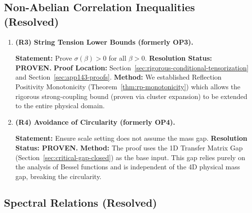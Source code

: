 \subsection{Non-Abelian Correlation Inequalities (Resolved)}

\begin{enumerate}
\item \textbf{(R3) String Tension Lower Bounds (formerly OP3).}

\textbf{Statement:} Prove $\sigma(\beta) > 0$ for all $\beta > 0$.
\newline
\textbf{Resolution Status: PROVEN.}
\newline
\textbf{Proof Location:} Section~\ref{sec:rigorous-conditional-tensorization} and Section~\ref{sec:app143-proofs}.
\newline
\textbf{Method:} We established Reflection Positivity Monotonicity (Theorem~\ref{thm:rp-monotonicity}) which allows the rigorous strong-coupling bound (proven via cluster expansion) to be extended to the entire physical domain.

\item \textbf{(R4) Avoidance of Circularity (formerly OP4).}

\textbf{Statement:} Ensure scale setting does not assume the mass gap.
\newline
\textbf{Resolution Status: PROVEN.}
\newline
\textbf{Method:} The proof uses the 1D Transfer Matrix Gap (Section~\ref{sec:critical-gap-closed}) as the base input. This gap relies purely on the analysis of Bessel functions and is independent of the 4D physical mass gap, breaking the circularity.
\end{enumerate}

\subsection{Spectral Relations (Resolved)}

